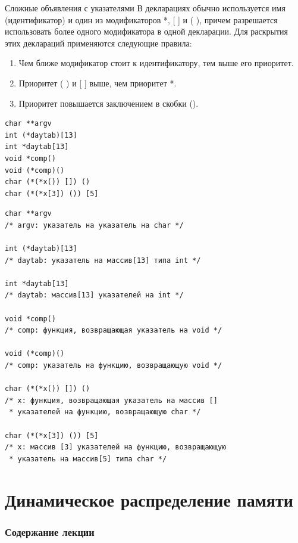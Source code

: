 \documentclass{beamer}
\begin{document}
\begin{frame}[fragile]{Сложные объявления с указателями}
В декларациях обычно используется имя (идентификатор) и один из модификаторов *, [ ] и ( ), причем разрешается использовать более одного модификатора в одной декларации. 
Для раскрытия этих деклараций применяются следующие правила:
\begin{enumerate}
\item Чем ближе модификатор стоит к идентификатору, тем выше его приоритет.
\item Приоритет ( ) и [ ] выше, чем приоритет *.
\item Приоритет повышается заключением в скобки ().
\end{enumerate}

\medskip
\begin{verbatim}
char **argv
int (*daytab)[13]
int *daytab[13]
void *comp()
void (*comp)()
char (*(*x()) []) ()
char (*(*x[3]) ()) [5]
\end{verbatim}
\end{frame}

\begin{frame}[fragile]
\begin{verbatim}
char **argv
/* argv: указатель на указатель на char */

int (*daytab)[13]
/* daytab: указатель на массив[13] типа int */

int *daytab[13]
/* daytab: массив[13] указателей на int */

void *comp()
/* comp: функция, возвращающая указатель на void */

void (*comp)()
/* comp: указатель на функцию, возвращающую void */

char (*(*x()) []) ()
/* x: функция, возвращающая указатель на массив [] 
 * указателей на функцию, возвращающую char */ 
 
char (*(*x[3]) ()) [5]
/* x: массив [З] указателей на функцию, возвращающую 
 * указатель на массив[5] типа char */
\end{verbatim}
\end{frame}

\section{Динамическое распределение памяти}

\begin{frame}
  \frametitle{Содержание лекции}
  \tableofcontents[current]
\end{frame}
\end{document}
